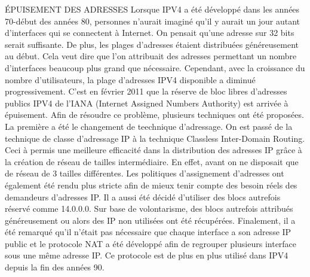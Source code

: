 \documentclass[twoside,openright,a4paper,11pt,french]{article}
\begin{document}
ÉPUISEMENT DES ADRESSES
Lorsque IPV4 a été développé dans les années 70-début des années 80, personnes n'aurait imaginé qu'il y aurait un jour autant d'interfaces qui se connectent à Internet. On pensait qu'une adresse sur 32 bits serait suffisante. De plus, les plages d'adresses étaient distribuées généreusement au début. Cela veut dire que l'on attribuait des adresses permettant un nombre d'interfaces beaucoup plus grand que nécessaire.
Cependant, avec la croissance du nombre d'utilisateurs, la plage d'adresses IPV4 disponible a diminué progressivement. C'est en février 2011 que la réserve de bloc libres d'adresses publics IPV4 de l'IANA (Internet Assigned Numbers Authority) est arrivée à épuisement.
Afin de résoudre ce problème, plusieurs techniques ont été proposées.
La première a été le changement de teechnique d'adressage. On est passé de la technique de classe d'adressage IP à la technique Classless Inter-Domain Routing. Ceci à permis une meilleure efficacité dans la distribution des adresses IP grâce à la création de réseau de tailles intermédiaire. En effet, avant on ne disposait que de réseau de 3 tailles différentes.
Les politiques d'assignement d'adresses ont également été rendu plus stricte afin de mieux tenir compte des besoin réels des demandeurs d'adresses IP.
Il a aussi été décidé d'utiliser des blocs autrefois réservé comme 14.0.0.0.
Sur base de volontarisme, des blocs autrefois attribués généreusement ou alors des IP non utilisées ont été récupérées. 
Finalement, il a été remarqué qu'il n'était pas nécessaire que chaque interface a son adresse IP public et le protocole NAT a été développé afin de regrouper plusieurs interface sous une même adresse IP. Ce protocole est de plus en plus utilisé dans IPV4 depuis la fin des années 90.
\end{document}

